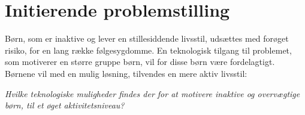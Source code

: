 \section{Initierende problemstilling}
Børn, som er inaktive og lever en stillesiddende livsstil, udsættes med forøget risiko, for en lang række følgesygdomme. En teknologisk tilgang til problemet, som motiverer en større gruppe børn, vil for disse børn være fordelagtigt. Børnene vil med en mulig løsning, tilvendes en mere aktiv livsstil: 

\begin{center}
\textit{Hvilke teknologiske muligheder findes der for at motivere inaktive og overvægtige børn, til et øget aktivitetsniveau?}
\end{center}